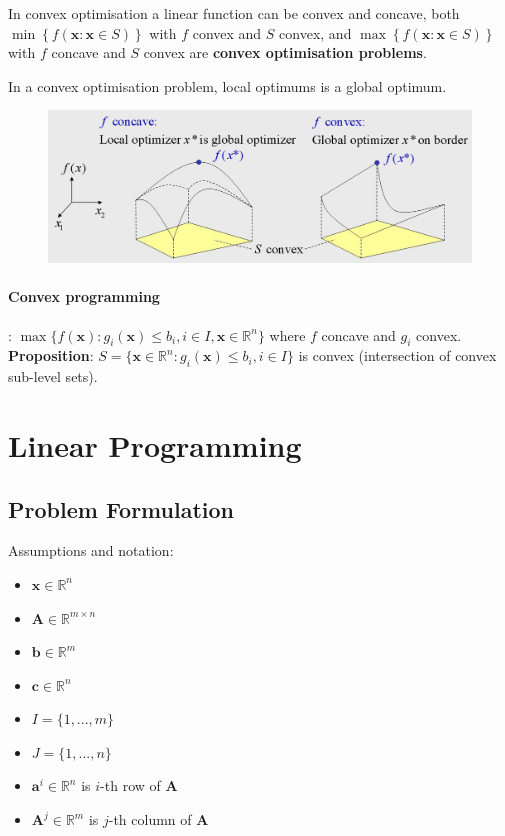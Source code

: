 \documentclass[11pt]{article}
\begin{document}
\noindent
In convex optimisation a linear function can be convex and concave, both $\min\left\{ f(\textbf{x}:\textbf{x}\in S) \right\}$ with $f$ convex and $S$ convex, and $\max\left\{ f(\textbf{x}:\textbf{x}\in S) \right\}$ with $f$ concave and $S$ convex are \textbf{convex optimisation problems}.
\begin{theorem}
	In a convex optimisation problem, local optimums is a global optimum.
\end{theorem}

\begin{figure}[H]
	\centering
	\includegraphics[width=0.7\linewidth, keepaspectratio]{convex_optimisation}
	\label{fig:convexoptimisation}
\end{figure}

\paragraph{Convex programming}: $\max\{ f(\textbf{x}):g_i (\textbf{x})\leq b_i , i\in I, \textbf{x} \in \mathbb{R}^n \}$ where $f$ concave and $g_i$ convex.\\
\textbf{Proposition}: $S = \{ \textbf{x}\in\mathbb{R}^n :g_i (\textbf{x})\leq b_i ,i\in I \}$ is convex (intersection of convex sub-level sets).

\section{Linear Programming}
\subsection{Problem Formulation}
Assumptions and notation:

\begin{itemize}[label=-,noitemsep,nosep]
	\item $\textbf{x}\in\mathbb{R}^n$
	\item $ \textbf{A}\in\mathbb{R}^{m\times n} $
	\item $ \textbf{b}\in\mathbb{R}^m $
	\item $ \textbf{c}\in\mathbb{R}^n $
	\item $ I = \{1,...,m\} $
	\item $ J = \{1,...,n\} $
	\item $ \textbf{a}^i\in\mathbb{R}^n $ is $i$-th row of $\textbf{A}$
	\item $ \textbf{A}^j\in\mathbb{R}^m $ is $j$-th column of $\textbf{A}$
\end{itemize}
\end{document}
